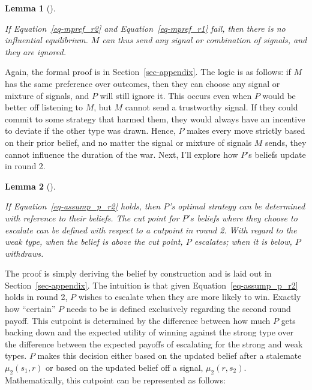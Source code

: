 \documentclass[
  12pt,
]{article}
\theoremstyle{plain}
\newtheorem{lemma}{Lemma}[section]
\theoremstyle{plain}
\theoremstyle{remark}
\begin{document}
\begin{lemma}[]\protect\hypertarget{lem-5}{}\label{lem-5}

If Equation~\ref{eq-mpref_r2} and Equation~\ref{eq-mpref_r1} fail, then
there is no influential equilibrium. \(M\) can thus send any signal or
combination of signals, and they are ignored.

\end{lemma}

Again, the formal proof is in Section~\ref{sec-appendix}. The logic is
as follows: if \(M\) has the same preference over outcomes, then they
can choose any signal or mixture of signals, and \(P\) will still ignore
it. This occurs even when \(P\) would be better off listening to \(M\),
but \(M\) cannot send a trustworthy signal. If they could commit to some
strategy that harmed them, they would always have an incentive to
deviate if the other type was drawn. Hence, \(P\) makes every move
strictly based on their prior belief, and no matter the signal or
mixture of signals \(M\) sends, they cannot influence the duration of
the war. Next, I'll explore how \(P\)'s beliefs update in round 2.

\begin{lemma}[]\protect\hypertarget{lem-4}{}\label{lem-4}

If Equation~\ref{eq-assump_p_r2} holds, then \(P\)'s optimal strategy
can be determined with reference to their beliefs. The cut point for
\(P's\) beliefs where they choose to escalate can be defined with
respect to a cutpoint in round 2. With regard to the weak type, when the
belief is above the cut point, \(P\) escalates; when it is below, \(P\)
withdraws.

\end{lemma}

The proof is simply deriving the belief by construction and is laid out
in Section~\ref{sec-appendix}. The intuition is that given
Equation~\ref{eq-assump_p_r2} holds in round 2, \(P\) wishes to escalate
when they are more likely to win. Exactly how ``certain'' \(P\) needs to
be is defined exclusively regarding the second round payoff. This
cutpoint is determined by the difference between how much \(P\) gets
backing down and the expected utility of winning against the strong type
over the difference between the expected payoffs of escalating for the
strong and weak types. \(P\) makes this decision either based on the
updated belief after a stalemate \(\mu_2(s_1, r)\) or based on the
updated belief off a signal, \(\mu_2(r, s_2)\). Mathematically, this
cutpoint can be represented as follows:
\end{document}
